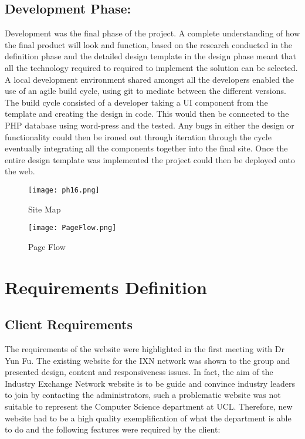 \hypertarget{development-phase}{%
\subsection{Development Phase:}\label{development-phase}}

Development was the final phase of the project. A complete understanding
of how the final product will look and function, based on the research
conducted in the definition phase and the detailed design template in
the design phase meant that all the technology required to required to
implement the solution can be selected. A local development environment
shared amongst all the developers enabled the use of an agile build
cycle, using git to mediate between the different versions. The build
cycle consisted of a developer taking a UI component from the template
and creating the design in code. This would then be connected to the PHP
database using word-press and the tested. Any bugs in either the design
or functionality could then be ironed out through iteration through the
cycle eventually integrating all the components together into the final
site. Once the entire design template was implemented the project could
then be deployed onto the web.

\begin{figure}[H]
      \centering
      \texttt{[image: ph16.png]}
      \caption{Site Map}
      \label{SiteMap}
 \end{figure}

\begin{figure}[H]
      \centering
      \texttt{[image: PageFlow.png]}
      \caption{Page Flow}
      \label{PageFlow}
 \end{figure}

\newpage

\hypertarget{requirements-definition}{%
\section{Requirements Definition}\label{requirements-definition}}

\hypertarget{client-requirements}{%
\subsection{Client Requirements}\label{client-requirements}}

The requirements of the website were highlighted in the first meeting
with Dr Yun Fu. The existing website for the IXN network was shown to
the group and presented design, content and responsiveness issues. In
fact, the aim of the Industry Exchange Network website is to be guide
and convince industry leaders to join by contacting the administrators,
such a problematic website was not suitable to represent the Computer
Science department at UCL. Therefore, new website had to be a high
quality exemplification of what the department is able to do and the
following features were required by the client:

